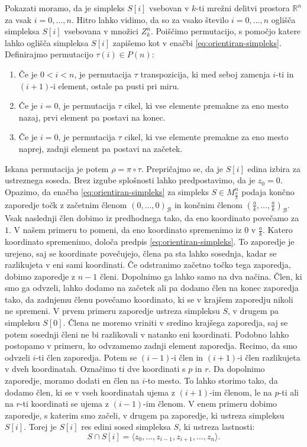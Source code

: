 \documentclass[mat1]{fmfdelo}
\newcommand{\R}{\mathbb R}
\newcommand{\0}{0}
\newcommand{\pB}{\mathcal B}
\begin{document}
\begin{dokaz}
Pokazati moramo, da je simpleks $S[i]$ vsebovan v $k$-ti mrežni delitvi prostora $\R^n$ za vsak $i = 0, \dots, n$. Hitro lahko vidimo, da so za vsako število $i = 0, \dots, n$ oglišča simpleksa $S[i]$ vsebovana v množici $Z_k^n$. Poiščimo permutacijo, s pomočjo katere lahko oglišča simpleksa $S[i]$ zapišemo kot v enačbi \eqref{eq:orientiran-simpleks}. 
Definirajmo permutacijo $\tau(i) \in P(n)$:
\begin{enumerate}
\item Če je $0 < i < n$, je permutacija $\tau$ transpozicija, ki med seboj zamenja $i$-ti in $(i+1)$-i element, ostale pa pusti pri miru.
\item Če je $i = 0$, je permutacija $\tau$ cikel, ki vse elemente premakne za eno mesto nazaj, prvi element pa postavi na konec.
\item Če je $i = 0$, je permutacija $\tau$ cikel, ki vse elemente premakne za eno mesto naprej, zadnji element pa postavi na začetek.
\end{enumerate}
Iskana permutacija je potem $\rho = \pi \circ \tau$.
Prepričajmo se, da je $S[i]$ edina izbira za ustreznega soseda. Brez izgube splošnosti lahko predpostavimo, da je $z_0 = 0$. Opazimo, da enačba \eqref{eq:orientiran-simpleks} za simpleks $S \in M_{\frac{a}{k}}^n$ podaja končno zaporedje točk z začetnim členom $(0, \dots, 0)_{\pB}$ in končnim členom $(\frac{a}{k}, \dots, \frac{a}{k})_{\pB}$. Vsak naslednji člen dobimo iz predhodnega tako, da eno koordinato povečamo za $1$. V našem primeru to pomeni, da eno koordinato spremenimo iz $0$ v $\frac{a}{k}$. Katero koordinato spremenimo, določa predpis \eqref{eq:orientiran-simpleks}. To zaporedje je urejeno, saj se koordinate povečujejo, člena pa sta lahko sosednja, kadar se razlikujeta v eni sami koordinati. Če odstranimo začetno točko tega zaporedja, dobimo zaporedje z $n-1$ členi. Dopolnimo ga lahko samo na dva načina. Člen, ki smo ga odvzeli, lahko dodamo na začetek ali pa dodamo člen na konec zaporedja tako, da zadnjemu členu povečamo koordinato, ki se v krajšem zaporedju nikoli ne spremeni. V prvem primeru zaporedje ustreza simpleksu $S$, v drugem pa simpleksu $S[0]$. Člena ne moremo vriniti v sredino krajšega zaporedja, saj se potem sosednji členi ne bi razlikovali v natanko eni koordinati. 
Podobno lahko postopamo v primeru, ko odvzamemo zadnji element zaporedja. Recimo, da smo odvzeli $i$-ti člen zaporedja. Potem se $(i-1)$-i člen in $(i+1)$-i člen razlikujeta v dveh koordinatah. Označimo ti dve koordinati s $p$ in $r$. Da dopolnimo zaporedje, moramo dodati en člen na $i$-to mesto. To lahko storimo tako, da dodamo člen, ki se v vseh koordinatah ujema z $(i+1)$-im členom, le na $p$-ti ali na $r$-ti koordinati se ujema z  $(i-1)$-im členom. V enem primeru dobimo zaporedje, s katerim smo začeli, v drugem pa zaporedje, ki ustreza simpleksu $S[i]$.
Torej je $S[i]$ res edini sosed simpleksa $S$, ki ustreza lastnosti:
$$S \cap S[i] = \langle z_0, \dots, z_{i-1}, z_{i+1}, \dots, z_n \rangle.$$

\end{dokaz}
\end{document}
